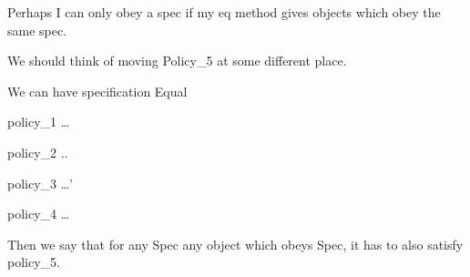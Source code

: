 Perhaps I can only obey a spec if my eq method gives objects which obey the same spec.

We should think of moving Policy_5 at some different place.

We can have 
specification Equal{

   policy_1
   …
  
   policy_2   
   .. 

   policy_3
   …’

   policy_4   
   …

  }

Then we say that for any Spec any object which obeys Spec, it has to also satisfy policy_5.
 
   
    


